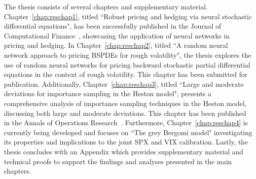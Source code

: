 The thesis consists of several chapters and supplementary material. Chapter~\ref{chap:reschap1}, titled ``Robust pricing and hedging via neural stochastic differential equations", has been successfully published in the Journal of Computational Finance~\cite{Gierjatowicz2023RobustEquations}, showcasing the application of neural networks in pricing and hedging. In Chapter~\ref{chap:reschap2}, titled ``A random neural network approach to pricing BSPDEs for rough volatility", the thesis explores the use of random neural networks for pricing backward stochastic partial differential equations in the context of rough volatility. This chapter has been submitted for publication. %
Additionally, Chapter~\ref{chap:reschap3}, titled ``Large and moderate deviations for importance sampling in the Heston model", presents a comprehensive analysis of importance sampling techniques in the Heston model, discussing both large and moderate deviations. This chapter has been published in the Annals of Operations Research~\cite{Geha2023LargeModel}. Furthermore, Chapter~\ref{chap:reschap4} is currently being developed and focuses on ``The grey Bergomi model" investigating its properties and implications to the joint SPX and VIX calibration. Lastly, the thesis concludes with an Appendix which provides supplementary material and technical proofs to support the findings and analyses presented in the main chapters.
